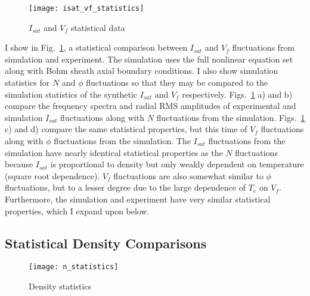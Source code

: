 \begin{figure}[!ht]
\centerline{\texttt{[image: isat\_vf\_statistics]}}
\caption{$I_{sat}$ and $V_f$ statistical data}
\label{isat_vf_statistics}
\end{figure}

I show in Fig.~\ref{isat_vf_statistics}, a statistical comparison between $I_{sat}$ and $V_f$ fluctuations from simulation and experiment. The simulation uses the full nonlinear equation
set along with Bohm sheath axial boundary conditions. I also show simulation statistics for $N$ and $\phi$ fluctuations so that they may be compared to the simulation statistics of the synthetic
$I_{sat}$ and $V_f$ respectively. Figs.~\ref{isat_vf_statistics} a) and b) compare the frequency spectra and radial RMS amplitudes of experimental and simulation $I_{sat}$ 
fluctuations along with $N$ fluctuations from the simulation. Figs.~\ref{isat_vf_statistics} c) and d) compare the same statistical properties, but this time of $V_f$ 
fluctuations along with $\phi$ fluctuations from the simulation. The $I_{sat}$ fluctuations from the simulation have nearly identical statistical properties as the $N$ fluctuations
because $I_{sat}$ is proportional to density but only weakly dependent on temperature (square root dependence). $V_f$ fluctuations are also somewhat similar to $\phi$ fluctuations,
but to a lesser degree due to the large dependence of $T_e$ on $V_f$. Furthermore, the simulation and experiment have very similar statistical properties, which I expand upon below.

\subsection{Statistical Density Comparisons}
\label{ss_stat_dens_comps}

\begin{figure}[!ht]
\centerline{\texttt{[image: n\_statistics]}}
\caption{Density statistics}
\label{n_statistics}
\end{figure}

